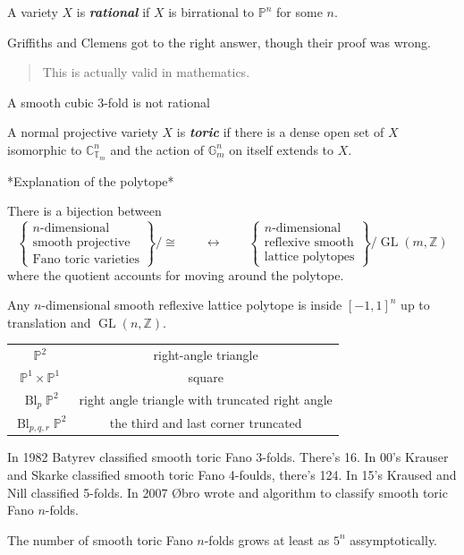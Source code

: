 \begin{defn}
	A variety $X$ is \textit{\textbf{rational}} if $ X$ is birrational to $\mathbb{P}^{n}$ for some $n$.
\end{defn}

Griffiths and Clemens got to the right answer, though their proof was wrong.

\begin{quotation}
	This is actually valid in mathematics.
\end{quotation}

\begin{thm}\leavevmode
	A smooth cubic 3-fold is not rational
\end{thm}

\begin{defn}
	A normal projective variety $X$ is \textit{\textbf{toric}} if there is a dense open set of $X$ isomorphic to $\mathbb{C}^{n}_{\mathbb{T}_{m}}$ and the action of $\mathbb{G}^{n}_{m}$ on itself extends to $X$.
\end{defn}

{\color{persimmon}*Explanation of the polytope*}

\begin{thm}[Cox]\leavevmode
	There is a bijection between
	\[\left\{ \substack{n\text{-dimensional}  \\\text{smooth projective} \\\text{Fano toric varieties}  } \right\}/\cong   \qquad \longleftrightarrow\qquad  \left\{ \substack{n\text{-dimensional}  \\ \text{reflexive smooth} \\\text{lattice polytopes} } \right\}/\operatorname{GL}(m,\mathbb{Z}) \]
	where the quotient accounts for moving around the polytope.
\end{thm}

\begin{conjecture}[Folklore?]
	Any $n$-dimensional smooth reflexive lattice polytope is inside $[-1,1]^{n}$ up to translation and $\operatorname{GL}(n,\mathbb{Z})$.
\end{conjecture}

\begin{tabular}{cc}
	$\mathbb{P}^{2}$ &right-angle triangle\\
	$\mathbb{P}^{1} \times \mathbb{P}^{1}$&square\\
	$\operatorname{Bl}_{p}\mathbb{P}^{2}$ &right angle triangle with truncated right angle\\
	$\operatorname{Bl}_{p,q,r}\mathbb{P}^{2}$& the third and last corner truncated

\end{tabular}
\begin{remark}
	In 1982 Batyrev classified smooth toric Fano 3-folds. There's 16. In 00's Krauser and Skarke classified smooth toric Fano 4-foulds, there's 124. In 15's Kraused and Nill classified 5-folds. In 2007 \O bro wrote and algorithm to classify smooth toric Fano $n$-folds.

	The number of smooth toric Fano $n$-folds grows at least as $5^{n}$ assymptotically.
\end{remark}

